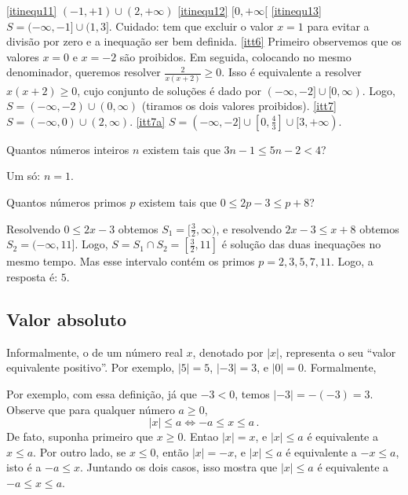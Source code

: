 \begin{exo}
\begin{sol}
 \eqref{itinequ11} $(-1,+1)\cup (2,+\infty)$
\eqref{itinequ12} $[0,+\infty[$
\eqref{itinequ13} $S=(-\infty,-1]\cup (1,3]$. Cuidado: tem que excluir o valor
$x=1$ para evitar a divisão por zero e a inequação ser bem
definida. 
\eqref{itt6} Primeiro observemos que os
valores $x=0$ e $x=-2$ são proibidos. Em seguida, colocando no mesmo denominador,
queremos resolver $\frac{2}{x(x+2)}\geq 0$. Isso é equivalente a resolver $x(x+2)\geq 0$,
cujo conjunto de soluções é dado por $(-\infty,-2]\cup [0,\infty)$. Logo,
$S=(-\infty,-2)\cup (0,\infty)$ (tiramos os dois valores proibidos).
\eqref{itt7} $S=(-\infty,0)\cup(2,\infty)$.
\eqref{itt7a} $S=(-\infty,-2]\cup [0,\tfrac43]\cup [3,+\infty)$.
\end{sol}
\end{exo}

\begin{exo}
Quantos números inteiros $n$ existem tais que $3n-1\leq 5n-2<4$?
\begin{sol}
Um só: $n=1$.
\end{sol}
\end{exo}

\begin{exo}
Quantos números primos $p$ existem tais que $0\leq 2p-3\leq p+8$?
\begin{sol}
Resolvendo $0\leq 2x-3$ obtemos $S_1=[\tfrac32,\infty)$, e resolvendo $2x-3\leq
x+8$ obtemos $S_2=(-\infty,11]$. Logo, $S=S_1\cap S_2=[\tfrac32,11]$ é solução
das duas inequações no mesmo tempo. Mas esse intervalo contém os primos
$p=2,3,5,7,11$. Logo, a resposta é: $5$. 
\end{sol}
\end{exo}

\subsection{Valor absoluto}

Informalmente, o  de um número real $x$, denotado por $|x|$,
representa o 
seu ``valor equivalente positivo''. Por exemplo, $|5|=5$, $|-3|=3$, e $|0|=0$.
Formalmente,


Por exemplo, com essa definição, já que $-3<0$, temos $|-3|=-(-3)=3$. 
Observe que para qualquer número $a\geq 0$,
\begin{equation}\label{eq:consequvalabsol}
|x|\leq a\Longleftrightarrow -a\leq x\leq a\,.
\end{equation}
De fato, suponha primeiro que $x\geq 0$. Entao $|x|=x$, e $|x|\leq a$
é equivalente a $x\leq a$. Por outro lado, se $x\leq 0$, então $|x|=-x$, e 
$|x|\leq a$ é equivalente a $-x\leq a$, isto é a $-a\leq x$.
Juntando os dois casos, isso mostra que $|x|\leq a$ é equivalente a $-a\leq
x\leq a$. 


